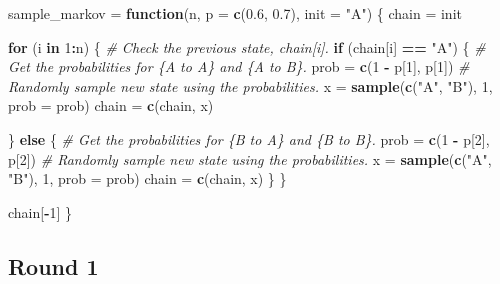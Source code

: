 \documentclass[
]{article}
\newenvironment{Shaded}{\begin{snugshade}}{\end{snugshade}}
\newcommand{\CommentTok}[1]{\textcolor[rgb]{0.56,0.35,0.01}{\textit{#1}}}
\newcommand{\ControlFlowTok}[1]{\textcolor[rgb]{0.13,0.29,0.53}{\textbf{#1}}}
\newcommand{\DataTypeTok}[1]{\textcolor[rgb]{0.13,0.29,0.53}{#1}}
\newcommand{\DecValTok}[1]{\textcolor[rgb]{0.00,0.00,0.81}{#1}}
\newcommand{\FloatTok}[1]{\textcolor[rgb]{0.00,0.00,0.81}{#1}}
\newcommand{\KeywordTok}[1]{\textcolor[rgb]{0.13,0.29,0.53}{\textbf{#1}}}
\newcommand{\NormalTok}[1]{#1}
\newcommand{\OperatorTok}[1]{\textcolor[rgb]{0.81,0.36,0.00}{\textbf{#1}}}
\newcommand{\StringTok}[1]{\textcolor[rgb]{0.31,0.60,0.02}{#1}}
\begin{document}
\begin{Shaded}
\begin{Highlighting}[]
\NormalTok{sample\_markov =}\StringTok{ }\ControlFlowTok{function}\NormalTok{(n, }\DataTypeTok{p =} \KeywordTok{c}\NormalTok{(}\FloatTok{0.6}\NormalTok{, }\FloatTok{0.7}\NormalTok{), }\DataTypeTok{init =} \StringTok{"A"}\NormalTok{) \{}
\NormalTok{  chain =}\StringTok{ }\NormalTok{init}

  \ControlFlowTok{for}\NormalTok{ (i }\ControlFlowTok{in} \DecValTok{1}\OperatorTok{:}\NormalTok{n) \{}
    \CommentTok{\# Check the previous state, chain[i].}
    \ControlFlowTok{if}\NormalTok{ (chain[i] }\OperatorTok{==}\StringTok{ "A"}\NormalTok{) \{}
      \CommentTok{\# Get the probabilities for \{A to A\} and \{A to B\}.}
\NormalTok{      prob =}\StringTok{ }\KeywordTok{c}\NormalTok{(}\DecValTok{1} \OperatorTok{{-}}\StringTok{ }\NormalTok{p[}\DecValTok{1}\NormalTok{], p[}\DecValTok{1}\NormalTok{])}
      \CommentTok{\# Randomly sample new state using the probabilities.}
\NormalTok{      x =}\StringTok{ }\KeywordTok{sample}\NormalTok{(}\KeywordTok{c}\NormalTok{(}\StringTok{"A"}\NormalTok{, }\StringTok{"B"}\NormalTok{), }\DecValTok{1}\NormalTok{, }\DataTypeTok{prob =}\NormalTok{ prob)}
\NormalTok{      chain =}\StringTok{ }\KeywordTok{c}\NormalTok{(chain, x)}

\NormalTok{    \} }\ControlFlowTok{else}\NormalTok{ \{}
      \CommentTok{\# Get the probabilities for \{B to A\} and \{B to B\}.}
\NormalTok{      prob =}\StringTok{ }\KeywordTok{c}\NormalTok{(}\DecValTok{1} \OperatorTok{{-}}\StringTok{ }\NormalTok{p[}\DecValTok{2}\NormalTok{], p[}\DecValTok{2}\NormalTok{])}
      \CommentTok{\# Randomly sample new state using the probabilities.}
\NormalTok{      x =}\StringTok{ }\KeywordTok{sample}\NormalTok{(}\KeywordTok{c}\NormalTok{(}\StringTok{"A"}\NormalTok{, }\StringTok{"B"}\NormalTok{), }\DecValTok{1}\NormalTok{, }\DataTypeTok{prob =}\NormalTok{ prob)}
\NormalTok{      chain =}\StringTok{ }\KeywordTok{c}\NormalTok{(chain, x)}
\NormalTok{    \}}
\NormalTok{  \}}

\NormalTok{  chain[}\OperatorTok{{-}}\DecValTok{1}\NormalTok{]}
\NormalTok{\}}
\end{Highlighting}
\end{Shaded}

\hypertarget{round-1}{%
\subsection{Round 1}\label{round-1}}
\end{document}
